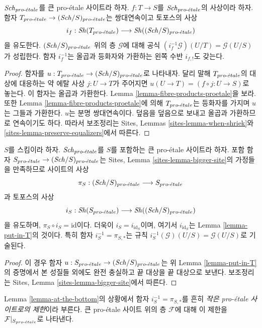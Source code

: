 \begin{lemma}
\label{lemma-put-in-T}
$\mathit{Sch}_{pro\text{-}\acute{e}tale}$를 큰 pro-\'etale 사이트라 하자.
$f : T \to S$를 $\mathit{Sch}_{pro\text{-}\acute{e}tale}$의 사상이라 하자.
함자 $T_{pro\text{-}\acute{e}tale} \to (\mathit{Sch}/S)_{pro\text{-}\acute{e}tale}$는 쌍대연속이고 토포스의 사상
$$
i_f :
\mathop{\mathit{Sh}}\nolimits(T_{pro\text{-}\acute{e}tale})
\longrightarrow
\mathop{\mathit{Sh}}\nolimits((\mathit{Sch}/S)_{pro\text{-}\acute{e}tale})
$$
을 유도한다. $(\mathit{Sch}/S)_{pro\text{-}\acute{e}tale}$ 위의 층 $\mathcal{G}$에 대해
공식 $(i_f^{-1}\mathcal{G})(U/T) = \mathcal{G}(U/S)$가 성립한다.
함자 $i_f^{-1}$는 올곱과 등화자와 가환하는 왼쪽 수반
$i_{f, !}$도 갖는다.
\end{lemma}

\begin{proof}
함자를 $u : T_{pro\text{-}\acute{e}tale} \to (\mathit{Sch}/S)_{pro\text{-}\acute{e}tale}$로 나타내자.
달리 말해 $T_{pro\text{-}\acute{e}tale}$의 대상에 대응하는 약 에탈 사상
$j : U \to T$가 주어지면 $u(U \to T) = (f \circ j : U \to S)$로 놓는다.
이 함자는 올곱과 가환한다. Lemma \ref{lemma-fibre-products-proetale}을 보라.
또한 Lemma \ref{lemma-fibre-products-proetale}에 의해 $T_{pro\text{-}\acute{e}tale}$는
등화자를 가지며 $u$는 그들과 가환한다. $u$는 분명 쌍대연속이다.
덮음을 덮음으로 보내고 올곱과 가환하므로 연속이기도 하다.
따라서 보조정리는 Sites, Lemmas \ref{sites-lemma-when-shriek}와
\ref{sites-lemma-preserve-equalizers}에서 따른다.
\end{proof}

\begin{lemma}
\label{lemma-at-the-bottom}
$S$를 스킴이라 하자. $\mathit{Sch}_{pro\text{-}\acute{e}tale}$를 $S$를 포함하는 큰
pro-\'etale 사이트라 하자. 포함 함자
$S_{pro\text{-}\acute{e}tale} \to (\mathit{Sch}/S)_{pro\text{-}\acute{e}tale}$는 Sites, Lemma
\ref{sites-lemma-bigger-site}의 가정들을 만족하므로 사이트의 사상
$$
\pi_S : (\mathit{Sch}/S)_{pro\text{-}\acute{e}tale} \longrightarrow S_{pro\text{-}\acute{e}tale}
$$
과 토포스의 사상
$$
i_S : \mathop{\mathit{Sh}}\nolimits(S_{pro\text{-}\acute{e}tale}) \longrightarrow \mathop{\mathit{Sh}}\nolimits((\mathit{Sch}/S)_{pro\text{-}\acute{e}tale})
$$
을 유도하며, $\pi_S \circ i_S = \text{id}$이다. 더욱이
$i_S = i_{\text{id}_S}$이며, 여기서 $i_{\text{id}_S}$는 Lemma
\ref{lemma-put-in-T}의 것이다. 특히 함자 $i_S^{-1} = \pi_{S, *}$는
규칙 $i_S^{-1}(\mathcal{G})(U/S) = \mathcal{G}(U/S)$로 기술된다.
\end{lemma}

\begin{proof}
이 경우 함자 $u : S_{pro\text{-}\acute{e}tale} \to (\mathit{Sch}/S)_{pro\text{-}\acute{e}tale}$는 위 Lemma
\ref{lemma-put-in-T}의 증명에서 본 성질들 외에도 완전 충실하고
끝 대상을 끝 대상으로 보낸다. 보조정리는 Sites, Lemma
\ref{sites-lemma-bigger-site}에서 따른다.
\end{proof}

\begin{definition}
\label{definition-restriction-small-proetale}
Lemma \ref{lemma-at-the-bottom}의 상황에서 함자
$i_S^{-1} = \pi_{S, *}$를 흔히 {\it 작은 pro-\'etale 사이트로의 제한}이라
부른다. 큰 pro-\'etale 사이트 위의 층 $\mathcal{F}$에 대해 이 제한을
$\mathcal{F}|_{S_{pro\text{-}\acute{e}tale}}$로 나타낸다.
\end{definition}

